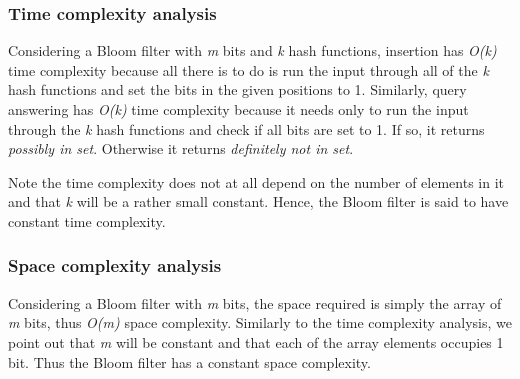 \subsubsection*{Time complexity analysis}
Considering a Bloom filter with \textit{m} bits and \textit{k} hash functions, insertion has \textit{O(k)} time complexity because all there is to do is run the input through all of the \textit{k} hash functions and set the bits in the given positions to 1. Similarly, query answering has \textit{O(k)} time complexity because it needs only to run the input through the \textit{k} hash functions and check if all bits are set to 1. If so, it returns \textit{possibly in set}. Otherwise it returns \textit{definitely not in set}. 

Note the time complexity does not at all depend on the number of elements in it and that \textit{k} will be a rather small constant. Hence, the Bloom filter is said to have constant time complexity.

\subsubsection*{Space complexity analysis}
Considering a Bloom filter with \textit{m} bits, the space required is simply the array of \textit{m} bits, thus \textit{O(m)} space complexity. Similarly to the time complexity analysis, we point out that \textit{m} will be constant and that each of the array elements occupies 1 bit. Thus the Bloom filter has a constant space complexity.

